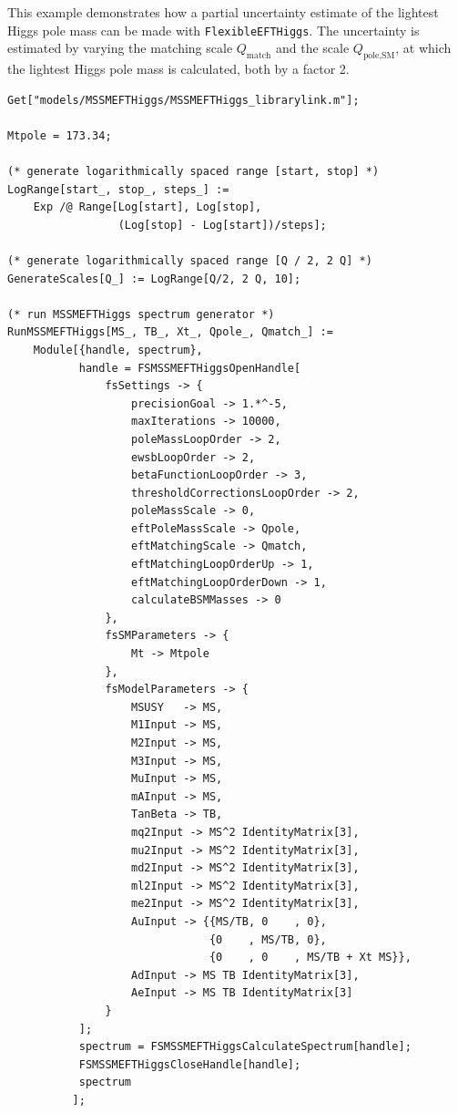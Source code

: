 \documentclass[final,3p,11pt,pdflatex]{elsarticle}
\makeatletter
\newcommand{\feft}{\texttt{Flex\-ib\-le\-EFT\-Higgs}\@\xspace}
\newcommand{\Qmatch}{\ensuremath{Q_\text{match}}}
\newcommand{\QpoleSM}{\ensuremath{Q_\text{pole,SM}}}
\makeatother
\begin{document}
\begin{example}[label=ex:MSSMEFTHiggs_uncertainty_estimate]
  This example demonstrates how a partial uncertainty estimate of the
  lightest Higgs pole mass can be made with \feft.  The
  uncertainty is estimated by varying the matching scale $\Qmatch$ and
  the scale $\QpoleSM$, at which the lightest Higgs pole mass is
  calculated, both by a factor 2.
  \begin{lstlisting}
Get["models/MSSMEFTHiggs/MSSMEFTHiggs_librarylink.m"];

Mtpole = 173.34;

(* generate logarithmically spaced range [start, stop] *)
LogRange[start_, stop_, steps_] :=
    Exp /@ Range[Log[start], Log[stop],
                 (Log[stop] - Log[start])/steps];

(* generate logarithmically spaced range [Q / 2, 2 Q] *)
GenerateScales[Q_] := LogRange[Q/2, 2 Q, 10];

(* run MSSMEFTHiggs spectrum generator *)
RunMSSMEFTHiggs[MS_, TB_, Xt_, Qpole_, Qmatch_] :=
    Module[{handle, spectrum},
           handle = FSMSSMEFTHiggsOpenHandle[
               fsSettings -> {
                   precisionGoal -> 1.*^-5,
                   maxIterations -> 10000,
                   poleMassLoopOrder -> 2,
                   ewsbLoopOrder -> 2,
                   betaFunctionLoopOrder -> 3,
                   thresholdCorrectionsLoopOrder -> 2,
                   poleMassScale -> 0,
                   eftPoleMassScale -> Qpole,
                   eftMatchingScale -> Qmatch,
                   eftMatchingLoopOrderUp -> 1,
                   eftMatchingLoopOrderDown -> 1,
                   calculateBSMMasses -> 0
               },
               fsSMParameters -> {
                   Mt -> Mtpole
               },
               fsModelParameters -> {
                   MSUSY   -> MS,
                   M1Input -> MS,
                   M2Input -> MS,
                   M3Input -> MS,
                   MuInput -> MS,
                   mAInput -> MS,
                   TanBeta -> TB,
                   mq2Input -> MS^2 IdentityMatrix[3],
                   mu2Input -> MS^2 IdentityMatrix[3],
                   md2Input -> MS^2 IdentityMatrix[3],
                   ml2Input -> MS^2 IdentityMatrix[3],
                   me2Input -> MS^2 IdentityMatrix[3],
                   AuInput -> {{MS/TB, 0    , 0},
                               {0    , MS/TB, 0},
                               {0    , 0    , MS/TB + Xt MS}},
                   AdInput -> MS TB IdentityMatrix[3],
                   AeInput -> MS TB IdentityMatrix[3]
               }
           ];
           spectrum = FSMSSMEFTHiggsCalculateSpectrum[handle];
           FSMSSMEFTHiggsCloseHandle[handle];
           spectrum
          ];


\end{lstlisting}
\end{example}
\end{document}
